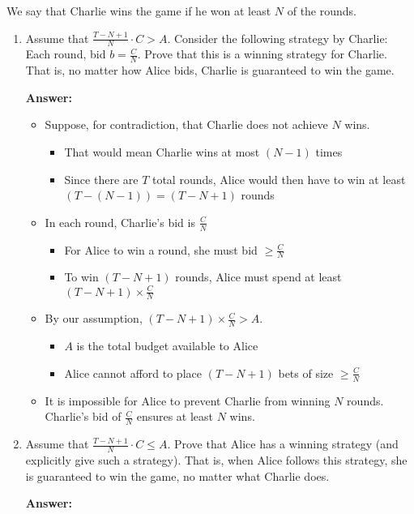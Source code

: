 \documentclass{article}
\begin{document}
We say that Charlie wins the game if he won at least $N$ of the rounds.

\begin{enumerate}
\item Assume that $\frac{T-N+1}{N} \cdot C > A$. Consider the following strategy by Charlie: Each round, bid $b = \frac{C}{N}$. Prove that this is a winning strategy for Charlie. That is, no matter how Alice bids, Charlie is guaranteed to win the game.

\textbf{Answer:}

\begin{itemize}
\item Suppose, for contradiction, that Charlie does not achieve $N$ wins.
  \begin{itemize}
  \item That would mean Charlie wins at most $(N-1)$ times
  \item Since there are $T$ total rounds, Alice would then have to win at least $(T - (N - 1)) = (T - N + 1)$ rounds
  \end{itemize}
\item In each round, Charlie's bid is $\frac{C}{N}$
  \begin{itemize}
  \item For Alice to win a round, she must bid $\geq \frac{C}{N}$
  \item To win $(T - N + 1)$ rounds, Alice must spend at least $(T - N + 1) \times \frac{C}{N}$
  \end{itemize}
\item By our assumption, $(T - N + 1) \times \frac{C}{N} > A$.
  \begin{itemize}
  \item $A$ is the total budget available to Alice
  \item Alice cannot afford to place $(T - N + 1)$ bets of size $\geq \frac{C}{N}$
  \end{itemize}
\item It is impossible for Alice to prevent Charlie from winning $N$ rounds. Charlie's bid of $\frac{C}{N}$ ensures at least $N$ wins.
\end{itemize}

\item Assume that $\frac{T-N+1}{N} \cdot C \leq A$. Prove that Alice has a winning strategy (and explicitly give such a strategy). That is, when Alice follows this strategy, she is guaranteed to win the game, no matter what Charlie does.

\textbf{Answer:}


\end{enumerate}
\end{document}
